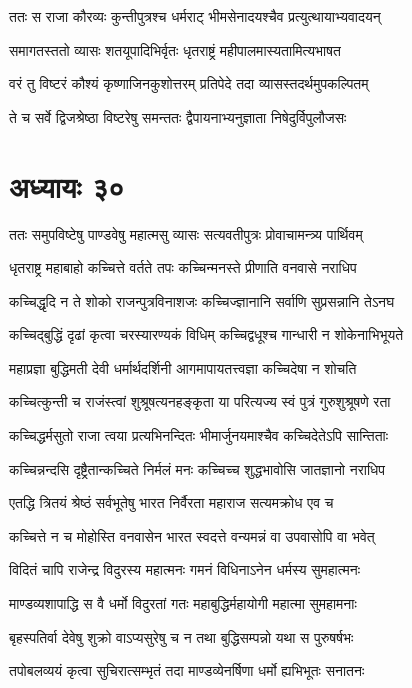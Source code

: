 \twolineshloka
{ततः स राजा कौरव्यः कुन्तीपुत्रश्च धर्मराट्}
{भीमसेनादयश्चैव प्रत्युत्थायाभ्यवादयन्}


\twolineshloka
{समागतस्ततो व्यासः शतयूपादिभिर्वृतः}
{धृतराष्ट्रं महीपालमास्यतामित्यभाषत}


\twolineshloka
{वरं तु विष्टरं कौश्यं कृष्णाजिनकुशोत्तरम्}
{प्रतिपेदे तदा व्यासस्तदर्थमुपकल्पितम्}


\twolineshloka
{ते च सर्वे द्विजश्रेष्ठा विष्टरेषु समन्ततः}
{द्वैपायनाभ्यनुज्ञाता निषेदुर्विपुलौजसः}


\chapter{अध्यायः ३०}
\twolineshloka
{ततः समुपविष्टेषु पाण्डवेषु महात्मसु}
{व्यासः सत्यवतीपुत्रः प्रोवाचामन्त्र्य पार्थिवम्}


\twolineshloka
{धृतराष्ट्र महाबाहो कच्चित्ते वर्तते तपः}
{कच्चिन्मनस्ते प्रीणाति वनवासे नराधिप}


\twolineshloka
{कच्चिद्धृदि न ते शोको राजन्पुत्रविनाशजः}
{कच्चिज्ज्ञानानि सर्वाणि सुप्रसन्नानि तेऽनघ}


\twolineshloka
{कच्चिद्बुद्धिं दृढां कृत्वा चरस्यारण्यकं विधिम्}
{कच्चिद्वधूश्च गान्धारी न शोकेनाभिभूयते}


\twolineshloka
{महाप्रज्ञा बुद्धिमती देवी धर्मार्थदर्शिनी}
{आगमापायतत्त्वज्ञा कच्चिदेषा न शोचति}


\twolineshloka
{कच्चित्कुन्ती च राजंस्त्वां शुश्रूषत्यनहङ्कृता}
{या परित्यज्य स्वं पुत्रं गुरुशुश्रूषणे रता}


\twolineshloka
{कच्चिद्धर्मसुतो राजा त्वया प्रत्यभिनन्दितः}
{भीमार्जुनयमाश्चैव कच्चिदेतेऽपि सान्तिताः}


\twolineshloka
{कच्चिन्नन्दसि दृष्ट्रैतान्कच्चिते निर्मलं मनः}
{कच्चिच्च शुद्धभावोसि जातज्ञानो नराधिप}


\twolineshloka
{एतद्धि त्रितयं श्रेष्ठं सर्वभूतेषु भारत}
{निर्वैरता महाराज सत्यमक्रोध एव च}


\twolineshloka
{कच्चित्ते न च मोहोस्ति वनवासेन भारत}
{स्वदत्ते वन्यमन्नं वा उपवासोपि वा भवेत्}


\twolineshloka
{विदितं चापि राजेन्द्र विदुरस्य महात्मनः}
{गमनं विधिनाऽनेन धर्मस्य सुमहात्मनः}


\twolineshloka
{माण्डव्यशापाद्धि स वै धर्मो विदुरतां गतः}
{महाबुद्धिर्महायोगी महात्मा सुमहामनाः}


\twolineshloka
{बृहस्पतिर्वा देवेषु शुक्रो वाऽप्यसुरेषु च}
{न तथा बुद्धिसम्पन्नो यथा स पुरुषर्षभः}


\twolineshloka
{तपोबलव्ययं कृत्वा सुचिरात्सम्भृतं तदा}
{माण्डव्येनर्षिणा धर्मो ह्यभिभूतः सनातनः}


